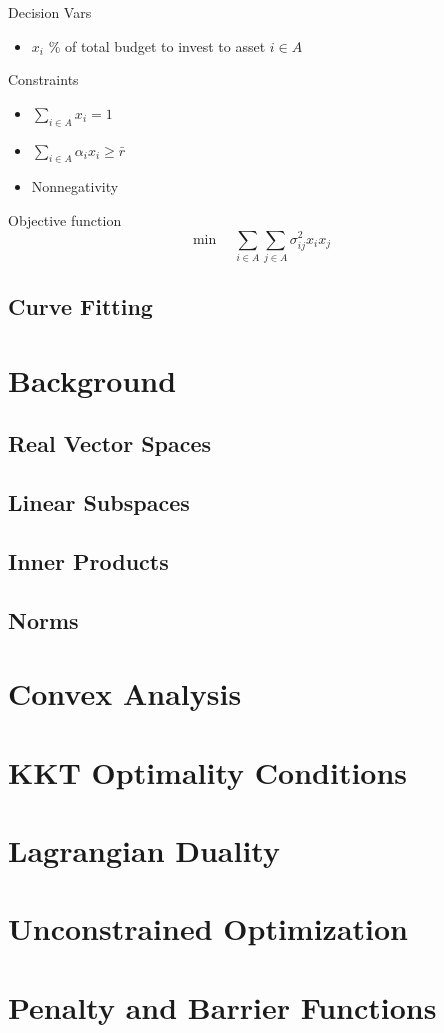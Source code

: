 			Decision Vars
			\begin{itemize}
				\item $x_i$ \% of total budget to invest to asset $i \in A$
			\end{itemize}

			Constraints
			\begin{itemize}
				\item $\sum_{i \in A} x_i = 1$
				\item $\sum_{i \in A} \alpha_i x_i \ge \bar{r}$
				\item Nonnegativity
			\end{itemize}

			Objective function
			\begin{equation}
				\min \quad \sum_{i \in A}\sum_{j \in A} \sigma_{ij}^2 x_i x_j
			\end{equation}

		\section{Curve Fitting}
			
	\chapter{Background}
		\section{Real Vector Spaces}

		\section{Linear Subspaces}

		\section{Inner Products}

		\section{Norms}

	\chapter{Convex Analysis}
		\section{}

	\chapter{KKT Optimality Conditions}

	\chapter{Lagrangian Duality}

	\chapter{Unconstrained Optimization}

	\chapter{Penalty and Barrier Functions}